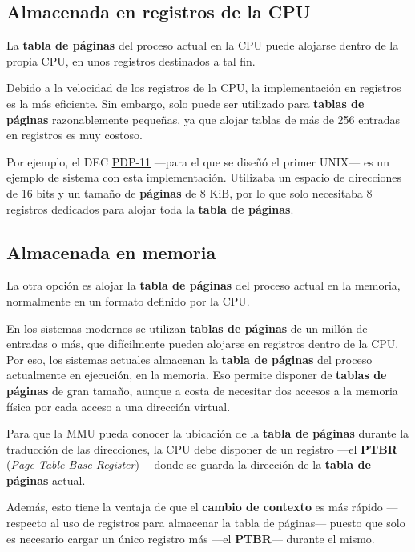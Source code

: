 \subsection{Almacenada en registros de la
CPU}\label{_almacenada_en_registros_de_la_cpu}

La \textbf{tabla de páginas} del proceso actual en la CPU puede alojarse
dentro de la propia CPU, en unos registros destinados a tal fin.

Debido a la velocidad de los registros de la CPU, la implementación en
registros es la más eficiente. Sin embargo, solo puede ser utilizado
para \textbf{tablas de páginas} razonablemente pequeñas, ya que alojar
tablas de más de 256 entradas en registros es muy costoso.

Por ejemplo, el DEC \href{https://es.wikipedia.org/wiki/PDP-11}{PDP-11}
---para el que se diseñó el primer UNIX--- es un ejemplo de sistema con
esta implementación. Utilizaba un espacio de direcciones de 16 bits y un
tamaño de \textbf{páginas} de 8 KiB, por lo que solo necesitaba 8
registros dedicados para alojar toda la \textbf{tabla de páginas}.

\subsection{Almacenada en memoria}\label{_almacenada_en_memoria}

La otra opción es alojar la \textbf{tabla de páginas} del proceso actual
en la memoria, normalmente en un formato definido por la CPU.

En los sistemas modernos se utilizan \textbf{tablas de páginas} de un
millón de entradas o más, que difícilmente pueden alojarse en registros
dentro de la CPU. Por eso, los sistemas actuales almacenan la
\textbf{tabla de páginas} del proceso actualmente en ejecución, en la
memoria. Eso permite disponer de \textbf{tablas de páginas} de gran
tamaño, aunque a costa de necesitar dos accesos a la memoria física por
cada acceso a una dirección virtual.

Para que la MMU pueda conocer la ubicación de la \textbf{tabla de
páginas} durante la traducción de las direcciones, la CPU debe disponer
de un registro ---el \textbf{{}PTBR} (\emph{Page-Table Base
Register})--- donde se guarda la dirección de la \textbf{tabla de
páginas} actual.

Además, esto tiene la ventaja de que el \textbf{cambio de contexto} es
más rápido ---respecto al uso de registros para almacenar la tabla de
páginas--- puesto que solo es necesario cargar un único registro más
---el \textbf{PTBR}--- durante el mismo.

